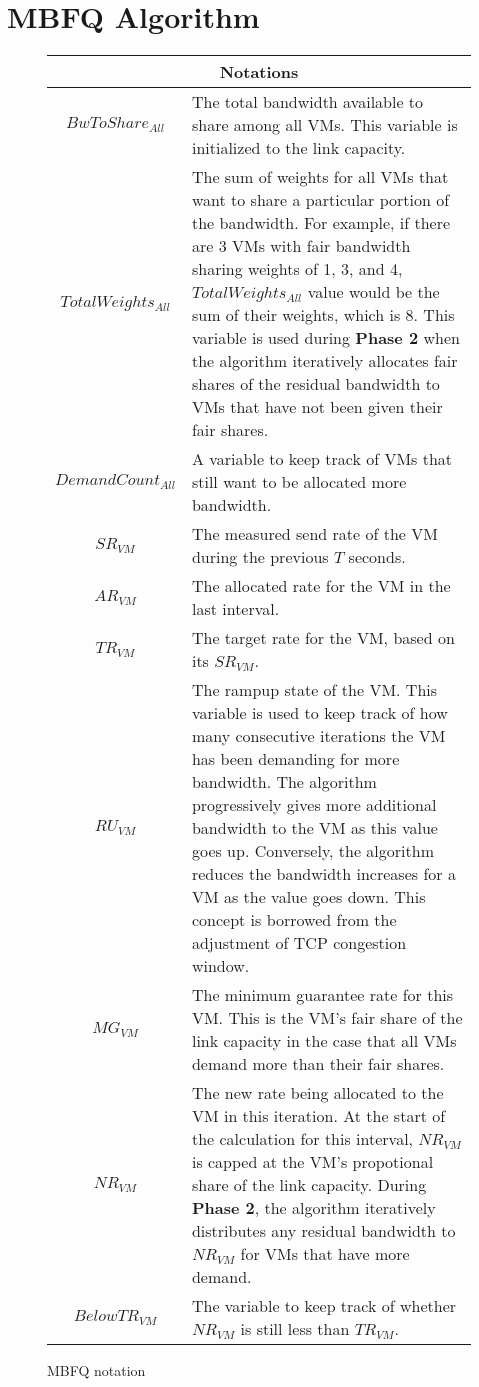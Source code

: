 \section{MBFQ Algorithm}
\label{sec:algorithm}

\begin{figure}[t]
{\footnotesize
\begin{tabular}{ | c | p{5cm} | }
  \hline
  \multicolumn{2}{|c|}{Notations} \\
  \hline \hline
  $BwToShare_{All}$ & The total bandwidth available to share among all VMs. This variable is
	initialized to the link capacity. \\ \hline
  $TotalWeights_{All}$ & The sum of weights for all VMs that want to share a particular
	portion of the bandwidth.  For example, if there are 3 VMs with fair bandwidth sharing weights of
        1, 3, and 4, $TotalWeights_{All}$ value would be the sum of their weights, which is 8.   
        This variable is used during {\bf Phase 2} when the algorithm iteratively
 	allocates fair shares of the residual bandwidth to VMs that have not been given their fair shares. \\ \hline
  $DemandCount_{All}$ & A variable to keep track of VMs that still want to be allocated more bandwidth. \\ \hline 
  $SR_{VM}$ & The measured send rate of the VM during the previous $T$ seconds. \\ \hline
  $AR_{VM}$ & The allocated rate for the VM in the last interval. \\ \hline
  $TR_{VM}$ & The target rate for the VM, based on its $SR_{VM}$. \\ \hline
  $RU_{VM}$ & The rampup state of the VM. This variable is used to keep track of how many consecutive
	iterations the VM has been demanding for more bandwidth. The algorithm progressively gives more
	additional bandwidth to the VM as this value goes up.  Conversely, the algorithm reduces the bandwidth
	increases for a VM as the value goes down.  This concept is borrowed from the adjustment of TCP
	congestion window. \\ \hline
  $MG_{VM} $ & The minimum guarantee rate for this VM.  This is the VM's fair share of the link capacity in the 
	case that all VMs demand more than their fair shares. \\ \hline
  $NR_{VM}$ & The new rate being allocated to the VM in this iteration.  At the start of the calculation for this
	interval, $NR_{VM}$ is capped at the VM's propotional share of the link capacity.  During {\bf Phase 2}, the
	algorithm iteratively distributes any residual bandwidth to $NR_{VM}$ for VMs that have more demand.   \\ \hline
  $BelowTR_{VM}$ & The variable to keep track of whether $NR_{VM}$ is still less than $TR_{VM}$. \\ \hline
\end{tabular}
}
\caption{MBFQ notation}
\label{fig:mbfq_init}
\end{figure}

